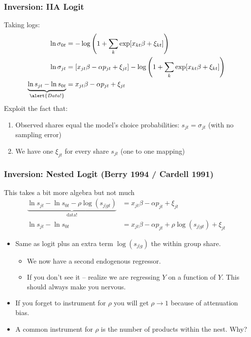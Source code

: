 \documentclass[aspectratio=169,10pt]{beamer}
\begin{document}
\begin{frame}
\frametitle{Inversion: IIA Logit}
Taking logs:
\begin{align*}
\ln \sigma_{0t} &= -\log \left(1+\sum_k \exp[x_{kt} \beta + \xi_{kt}] \right) \\
\ln \sigma_{jt} &= [x_{jt} \beta - \alpha p_{jt} +  \xi_{jt} ] - \log \left(1+\sum_k \exp[x_{kt} \beta + \xi_{kt}] \right)\\
\underbrace{\ln s_{jt}- \ln s_{0t}}_{\alert{Data!}} &= x_{jt} \beta -\alpha p_{jt} +  \xi_{jt}
\end{align*}
Exploit the fact that: 
\begin{enumerate}
\item Observed shares equal the model's choice probabilities: $s_{jt} = \sigma_{jt}$ (with no sampling error)
\item We have one $\xi_{jt}$ for every share $s_{jt}$ (one to one mapping)
\end{enumerate}
\end{frame}



\begin{frame}
\frametitle{Inversion: Nested Logit (Berry 1994 / Cardell 1991)}
This takes a bit more algebra but not much
\begin{align*}
\underbrace{\ln s_{jt}- \ln s_{0t}  - \rho \log(s_{j|gt}) }_{\text{data!}}&= x_{jt} \beta -\alpha p_{jt} +  \xi_{jt} \\
\ln s_{jt}- \ln s_{0t} &= x_{jt} \beta -\alpha p_{jt} +  \rho \log(s_{j|gt})  +  \xi_{jt}
\end{align*}
 \begin{itemize}
\item Same as logit plus an extra term $\log(s_{j|g})$ the \alert{within group share}.
\begin{itemize}
\item We now have a second endogenous regressor.
\item If you don't see it -- realize we are regressing $Y$ on a function of $Y$. This should always make you nervous.
 \end{itemize}
\item If you forget to instrument for $\rho$ you will get $\rho \rightarrow 1$ because of \alert{attenuation bias}.
\item A common instrument for $\rho$ is the number of products within the nest. Why?
 \end{itemize}
\end{frame}
\end{document}
